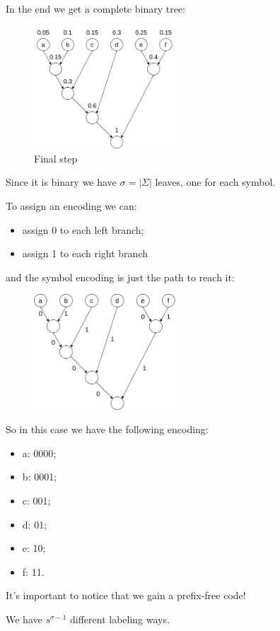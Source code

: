In the end we get a complete binary tree:
\begin{figure}[H]
    \centering
    \includegraphics[width=200px]{images/10_Data_compression/huffman_5.png}
    \caption{Final step}
\end{figure}

Since it is binary we have $\sigma = |\Sigma|$ leaves, one for each symbol.

To assign an encoding we can:
\begin{itemize}
    \item assign 0 to each left branch;
    \item assign 1 to each right branch
\end{itemize}
and the symbol encoding is just the path to reach it:
\begin{figure}[H]
    \centering
    \includegraphics[width=200px]{images/10_Data_compression/huffman_encoding.png}
\end{figure}

So in this case we have the following encoding:
\begin{itemize}
    \item a: 0000;
    \item b: 0001;
    \item c: 001;
    \item d: 01;
    \item e: 10;
    \item f: 11.
\end{itemize}
It's important to notice that we gain a prefix-free code!

We have $s^{\sigma-1}$ different labeling ways.


